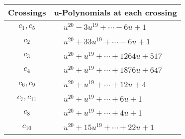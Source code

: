 \documentclass[1p]{elsarticle_modified}
\theoremstyle{definition}
\begin{document}
\begin{tabular}{m{50pt}|m{274pt}}
Crossings & \hspace{64pt}u-Polynomials at each crossing \\
\hline $$\begin{aligned}c_{1},c_{5}\end{aligned}$$&$\begin{aligned}
&u^{20}-3 u^{19}+\cdots-6 u+1
\end{aligned}$\\
\hline $$\begin{aligned}c_{2}\end{aligned}$$&$\begin{aligned}
&u^{20}+33 u^{19}+\cdots-6 u+1
\end{aligned}$\\
\hline $$\begin{aligned}c_{3}\end{aligned}$$&$\begin{aligned}
&u^{20}+u^{19}+\cdots+1264 u+517
\end{aligned}$\\
\hline $$\begin{aligned}c_{4}\end{aligned}$$&$\begin{aligned}
&u^{20}+u^{19}+\cdots+1876 u+647
\end{aligned}$\\
\hline $$\begin{aligned}c_{6},c_{9}\end{aligned}$$&$\begin{aligned}
&u^{20}+u^{19}+\cdots+12 u+4
\end{aligned}$\\
\hline $$\begin{aligned}c_{7},c_{11}\end{aligned}$$&$\begin{aligned}
&u^{20}+u^{19}+\cdots+6 u+1
\end{aligned}$\\
\hline $$\begin{aligned}c_{8}\end{aligned}$$&$\begin{aligned}
&u^{20}+u^{19}+\cdots+4 u+1
\end{aligned}$\\
\hline $$\begin{aligned}c_{10}\end{aligned}$$&$\begin{aligned}
&u^{20}+15 u^{19}+\cdots+22 u+1
\end{aligned}$\\
\hline
\end{tabular}\\~\\
\end{document}
